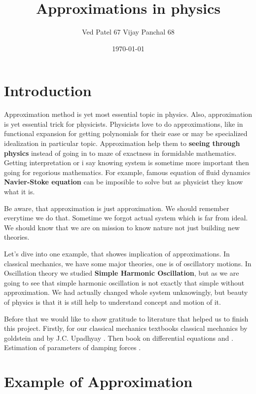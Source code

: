 \documentclass[11pt,a4paper]{article}
\author{Ved Patel 67 Vijay Panchal 68}
\date{\today}
\title{Approximations in physics}
\begin{document}
\maketitle
\tableofcontents

\pagebreak
\section{Introduction}
\label{sec:org945b407}

Approximation method is yet most essential topic in physics. Also, approximation is yet essential trick for physicists. Physicists love to do approximations, like in functional expansion for getting polynomials for their ease or may be specialized idealization in particular topic. Approximation help them to \textbf{seeing through physics} instead of going in to maze of exactness in formidable  mathematics. Getting interpretation or i say knowing system is sometime more important then going for regorious mathematics. For example, famous equation of fluid dynamics \textbf{Navier-Stoke equation} can be imposible to solve but as physicist they know what it is.

Be aware, that approximation is just approximation. We should remember everytime we do that. Sometime we forgot actual system which is far from ideal. We should know that we are on mission to know nature not just building new theories.

Let's dive into one example, that showes implication of approximations. In classical mechanics, we have some major theories, one is of oscillatory motions. In Oscillation theory we studied \textbf{Simple Harmonic Oscillation}, but as we are going to see that simple harmonic oscillation is not exactly that simple without approximation. We had actually changed whole system unknowingly, but beauty of physics is that it is still help to understand concept and motion of it. 

Before that we would like to show gratitude to literature that helped us to finish this project. Firstly, for our classical mechanics textbooks classical mechanics by goldstein \cite{goldstein2002classical} and by J.C. Upadhyay \cite{upadhyay2016classical}. Then book on differential equations \cite{bronson2014schaum} and \cite{jordan2007nonlinear}. Estimation of parameters of damping forces \cite{salamon2020estimation}.

\section{Example of Approximation}
\label{sec:org85169f9}
\end{document}
